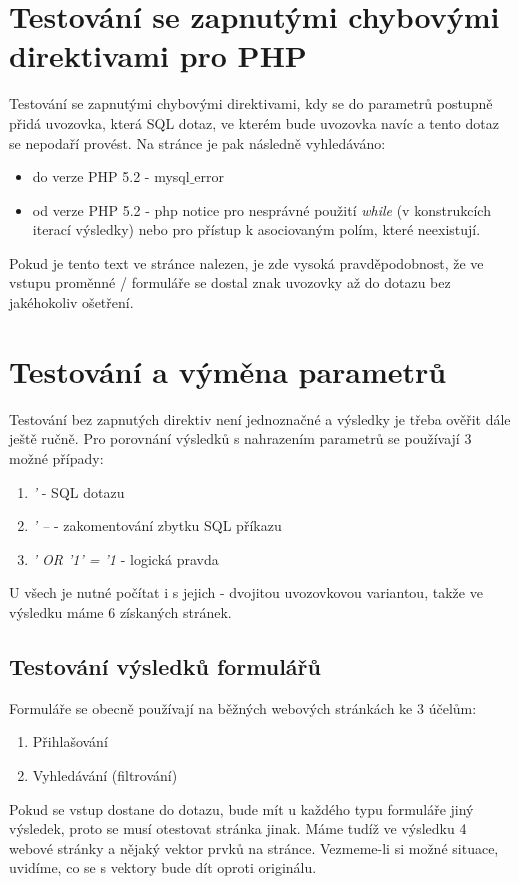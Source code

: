 \documentclass[12pt, a4paper]{report}
\begin{document}
\section{Testování se zapnutými chybovými direktivami pro PHP}
Testování se zapnutými chybovými direktivami, kdy se do parametrů postupně přidá uvozovka, která  SQL dotaz, ve kterém bude uvozovka navíc a tento dotaz se nepodaří provést. Na stránce je pak následně vyhledáváno:
\begin{itemize}
\item do verze PHP 5.2 - mysql$\_$error
\item od verze PHP 5.2 - php notice pro nesprávné použití \textit{while} (v konstrukcích iterací výsledky) nebo pro přístup k asociovaným polím, které neexistují.
\end{itemize}
Pokud je tento text ve stránce nalezen, je zde vysoká pravděpodobnost, že ve vstupu proměnné / formuláře se dostal znak uvozovky až do dotazu bez jakéhokoliv ošetření.

\section{Testování a výměna parametrů}
Testování bez zapnutých direktiv není jednoznačné a výsledky je třeba ověřit dále ještě ručně. Pro porovnání výsledků s nahrazením parametrů se používají 3 možné případy:
\begin{enumerate}
\item \textit{'} -  SQL dotazu
\item \textit{' --} - zakomentování zbytku SQL příkazu
\item \textit{' OR '1' = '1} - logická pravda
\end{enumerate}
U všech je nutné počítat i s jejich  - dvojitou uvozovkovou variantou, takže ve výsledku máme 6 získaných stránek.

\subsection{Testování výsledků formulářů}
Formuláře se obecně používají na běžných webových stránkách ke 3 účelům:
\begin{enumerate}
\item Přihlašování
\item Vyhledávání (filtrování)
\end{enumerate}
Pokud se  vstup dostane do dotazu, bude mít u každého typu formuláře jiný výsledek, proto se musí otestovat stránka jinak. Máme tudíž ve výsledku 4 webové stránky a nějaký vektor prvků na stránce. Vezmeme-li si možné situace, uvidíme, co se s vektory bude dít oproti originálu.
\end{document}
